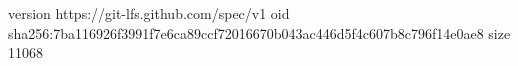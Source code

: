 version https://git-lfs.github.com/spec/v1
oid sha256:7ba116926f3991f7e6ca89ccf72016670b043ac446d5f4c607b8c796f14e0ae8
size 11068
